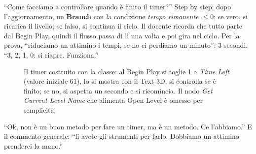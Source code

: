 ``Come facciamo a controllare quando è finito il timer?'' Step by step: dopo
l'aggiornamento, un \textbf{Branch} con la condizione \emph{tempo rimanente
$\leq 0$}; se vero, si ricarica il livello; se falso, si continua il ciclo. Il
docente ricorda che tutto parte dal Begin Play, quindi il flusso passa di lì una
volta e poi gira nel ciclo. Per la prova, ``riduciamo un attimino i tempi, se no
ci perdiamo un minuto'': 3 secondi. ``3, 2, 1, 0: si riapre. Funziona.''

\begin{figure}[htbp]
\centering
{}
\caption{Il timer costruito con la classe: al Begin Play si toglie 1 a
\emph{Time Left} (valore iniziale 61), lo si mostra con il Text 3D, si controlla
se è finito; se no, si aspetta un secondo e si ricomincia. Il nodo
\emph{Get Current Level Name} che alimenta Open Level è omesso per
semplicità.}
\label{gd13:fig:timer}
\end{figure}

``Ok, non è un buon metodo per fare un timer, ma è un metodo. Ce l'abbiamo.''
E il commento generale: ``li avete gli strumenti per farlo. Dobbiamo un attimino
prenderci la mano.''

